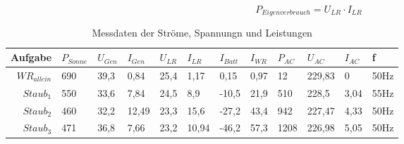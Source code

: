 \begin{equation}
	P_{ Eigenverbrauch }= U_{ LR} \cdot I_{ LR }
\label{eq:230509_Eigenverbrauch}
\end{equation} 


\begin{table}[!ht]
    \caption{Messdaten der Ströme, Spannungn und Leistungen }
	\centering
	\renewcommand{\arraystretch}{2}
\begin{tabularx}{\linewidth}{|r|X|X|X|X|X|X|X|X|X|X|X|}
\hline
\rowcolor[HTML]{76B900} 
{\color[HTML]{000000} Aufgabe}          & {\color[HTML]{000000} $P_{Sonne}$} & {\color[HTML]{000000} $U_{Gen}$} & {\color[HTML]{000000} $I_{Gen}$} & {\color[HTML]{000000} $U_{LR}$} & {\color[HTML]{000000} $I_{LR}$} & {\color[HTML]{000000} $I_{Batt}$} & {\color[HTML]{000000} $I_{WR}$} & {\color[HTML]{000000} $P_{AC}$} & {\color[HTML]{000000} $U_{AC}$} & {\color[HTML]{000000} $I_{AC}$} & {\color[HTML]{000000} f} \\ \hline
\rowcolor[HTML]{FFFFFF} 
\cellcolor[HTML]{CFE5A8}${WR}_{allein}$      & 690                             & 39,3                          & 0,84                          & 25,4                         & 1,17                         & 0,15                           & 0,97                         & 12                           & 229,83                       & 0                            & 50Hz                       \\ \hline
\rowcolor[HTML]{FFFFFF} 
\cellcolor[HTML]{CFE5A8}$Staub_{1}$        & 550                             & 33,6                          & 7,84                          & 24,5                         & 8,9                          & -10,5                          & 21,9                         & 510                          & 228,5                        & 3,04                         & 55Hz\\ \hline
\rowcolor[HTML]{FFFFFF} 
\cellcolor[HTML]{CFE5A8}$Staub_{2}$        & 460                             & 32,2                          & 12,49                         & 23,3                         & 15,6                         & -27,2                          & 43,4                         & 942                          & 227,47                       & 4,33                         & 50Hz\\ \hline
\rowcolor[HTML]{FFFFFF} 
\cellcolor[HTML]{CFE5A8}$Staub_{3}$        & 471                             & 36,8                          & 7,66                          & 23,2                         & 10,94                        & -46,2                          & 57,3                         & 1208                         & 226,98                       & 5,05                         & 50Hz\\ \hline

\end{tabularx}
\end{table}
